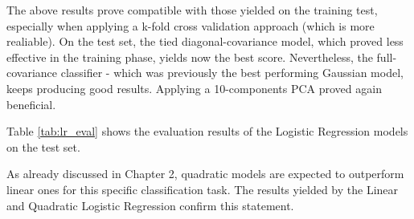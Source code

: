 The above results prove compatible with those yielded on the training test, especially when applying a k-fold cross validation approach (which is more realiable). On the test set, the tied diagonal-covariance model, which proved less effective in the training phase, yields now the best score. Nevertheless, the full-covariance classifier - which was previously the best performing Gaussian model, keeps producing good results. Applying a 10-components PCA proved again beneficial. 

Table \ref{tab:lr_eval} shows the evaluation results of the Logistic Regression models on the test set.

\noindent
\begin{table}[H]
	\caption{min DCF for Logistic Regression models for different values of $\tilde{\pi}$ on the test set.}
	\label{tab:lr_eval}
\end{table}

As already discussed in Chapter 2, quadratic models are expected to outperform linear ones for this specific classification task. The results yielded by the Linear and Quadratic Logistic Regression confirm this statement. 

